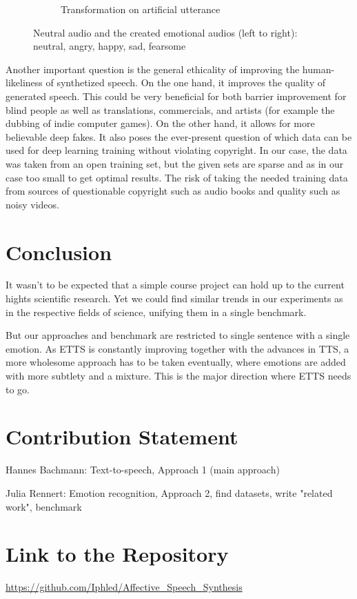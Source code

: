 \documentclass[11pt]{article}
\begin{document}
\begin{figure}
\begin{subfigure}{.5\textwidth}
\begin{subfigure}{.18\textwidth}
  \label{fig:sfig2}
\end{subfigure}
\caption{Transformation on artificial utterance}
\end{subfigure}
\caption{Neutral audio and the created emotional audios (left to right): neutral, angry, happy, sad, fearsome}
\label{fig:fig}
\end{figure}
Another important question is the general ethicality of improving the human-likeliness of synthetized speech. On the one hand, it improves the quality of generated speech. This could be very beneficial for both barrier improvement for blind people as well as translations, commercials, and artists (for example the dubbing of indie computer games). On the other hand, it allows for more believable deep fakes. It also poses the ever-present question of which data can be used for deep learning training without violating copyright. In our case, the data was taken from an open training set, but the given sets are sparse and as in our case too small to get optimal results\cite{he_improve_2022}. The risk of taking the needed training data from sources of questionable copyright such as audio books and quality such as noisy videos.

\section{Conclusion}
\label{conclusion}
It wasn't to be expected that a simple course project can hold up to the current hights scientific research. Yet we could find similar trends in our experiments as in the respective fields of science, unifying them in a single benchmark. 

But our approaches and benchmark are restricted to single sentence with a single emotion.
As ETTS is constantly improving together with the advances in TTS, a more wholesome approach has to be taken eventually, where emotions are added with more subtlety and a mixture. This is the major direction where ETTS needs to go.

\section{Contribution Statement}
Hannes Bachmann: Text-to-speech, Approach 1 (main approach)

Julia Rennert: Emotion recognition, Approach 2, find datasets, write "related work", benchmark

\section{Link to the Repository}
{\small\url{https://github.com/Iphled/Affective\_Speech\_Synthesis}}
\end{document}
